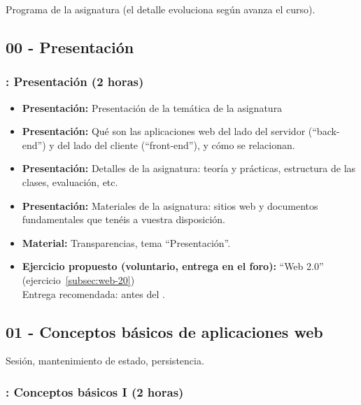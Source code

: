 \documentclass[a4paper,12pt]{article}
\begin{document}
Programa de la asignatura (el detalle evoluciona según avanza el curso).

\subsection{00 - Presentación}

\subsubsection{\lunesAa: Presentación  (2 horas)}
\label{cal:lunesAa}

\begin{itemize}
\item \textbf{Presentación:} Presentación de la temática de la asignatura
\item \textbf{Presentación:} Qué son las aplicaciones web del lado del servidor (``back-end'') y del lado del cliente (``front-end''), y cómo se relacionan.
\item \textbf{Presentación:} Detalles de la asignatura: teoría y prácticas, estructura de las clases, evaluación, etc.
\item \textbf{Presentación:} Materiales de la asignatura: sitios web y documentos fundamentales que tenéis a vuestra disposición.
\item \textbf{Material:} Transparencias, tema ``Presentación''.
\item \textbf{Ejercicio propuesto (voluntario, entrega en el foro):} ``Web 2.0'' (ejercicio~\ref{subsec:web-20}) \\
  Entrega recomendada: antes del \juevesB.
\end{itemize}


\subsection{01 - Conceptos básicos de aplicaciones web}

Sesión, mantenimiento de estado, persistencia.

\subsubsection{\lunesA: Conceptos básicos I (2 horas)}
\label{cal:lunesA}
\end{document}
